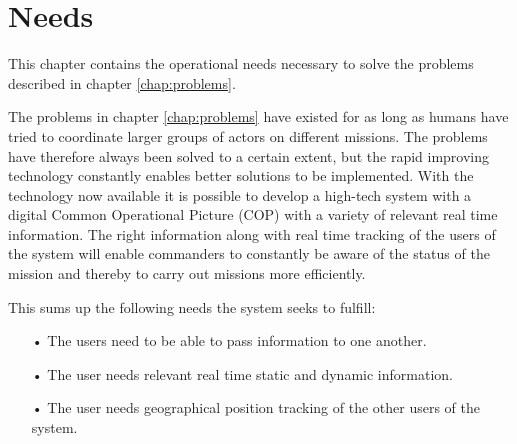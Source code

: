\chapter{Needs}
This chapter contains the operational needs necessary to solve the problems described in chapter \ref{chap:problems}. 

The problems in chapter \ref{chap:problems} have existed for as long as humans have tried to coordinate larger groups of actors on different missions. The problems have therefore always been solved to a certain extent, but the rapid improving technology constantly enables better solutions to be implemented. With the technology now available it is possible to develop a high-tech system with a digital Common Operational Picture (COP) with a variety of relevant real time information. The right information along with real time tracking of the users of the system will enable commanders to constantly be aware of the status of the mission and thereby to carry out missions more efficiently. 

This sums up the following needs the system seeks to fulfill:

\begin{enumerate}
\item[•] The users need to be able to pass information to one another. 
\item[•] The user needs relevant real time static and dynamic information. 
\item[•] The user needs geographical position tracking of the other users of the system. 
\end{enumerate}
